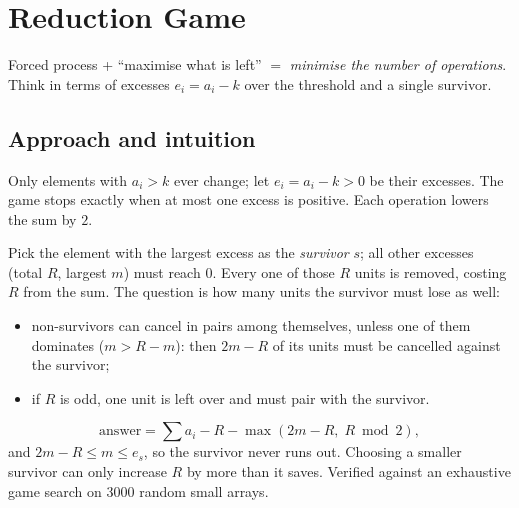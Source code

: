 \section{Reduction Game}
\label{sec:g-reduction-game}


\begin{patternbox}
Forced process + ``maximise what is left'' $=$ \emph{minimise the number of
operations}. Think in terms of excesses $e_i=a_i-k$ over the threshold and a
single survivor.
\end{patternbox}

\subsection*{Approach and intuition}

Only elements with $a_i>k$ ever change; let $e_i=a_i-k>0$ be their excesses.
The game stops exactly when at most one excess is positive. Each operation
lowers the sum by $2$.

Pick the element with the largest excess as the \emph{survivor} $s$; all other
excesses (total $R$, largest $m$) must reach $0$. Every one of those $R$ units
is removed, costing $R$ from the sum. The question is how many units the
survivor must lose as well:
\begin{itemize}
  \item non-survivors can cancel in pairs among themselves, unless one of
        them dominates ($m>R-m$): then $2m-R$ of its units must be cancelled
        against the survivor;
  \item if $R$ is odd, one unit is left over and must pair with the survivor.
\end{itemize}

\begin{ideabox}[Result]
\[
  \text{answer}=\sum a_i - R - \max(2m-R,\; R\bmod 2),
\]
and $2m-R\le m\le e_s$, so the survivor never runs out. Choosing a smaller
survivor can only increase $R$ by more than it saves. Verified against an
exhaustive game search on 3000 random small arrays.
\end{ideabox}

